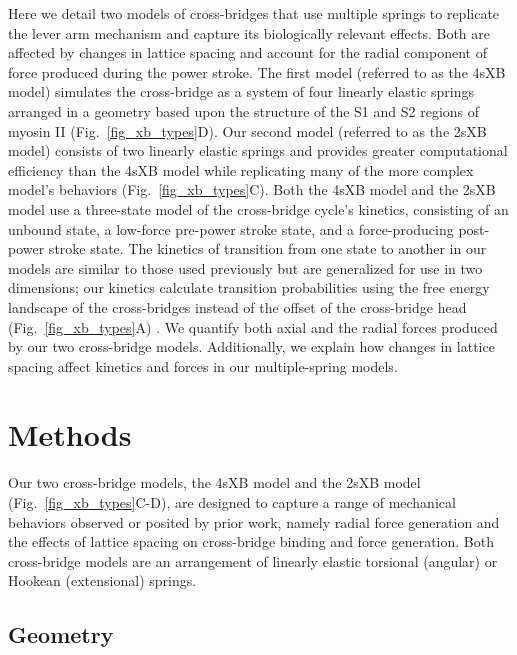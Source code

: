 \documentclass[11pt,titlepage]{article}
\begin{document}
Here we detail two models of cross-bridges that use multiple springs to replicate the lever arm mechanism and capture its biologically relevant effects.  
Both are affected by changes in lattice spacing and account for the radial component of force produced during the power stroke.  
The first model (referred to as the 4sXB model) simulates the cross-bridge as a system of four linearly elastic springs arranged in a geometry based upon the structure of the S1 and S2 regions of myosin II (Fig.~\ref{fig_xb_types}D).  
Our second model (referred to as the 2sXB model) consists of two linearly elastic springs and provides greater computational efficiency than the 4sXB model while replicating many of the more complex model's behaviors (Fig.~\ref{fig_xb_types}C). 
Both the 4sXB model and the 2sXB model use a three-state model of the cross-bridge cycle's kinetics, consisting of an unbound state, a low-force pre-power stroke state, and a force-producing post-power stroke state. 
The kinetics of transition from one state to another in our models are similar to those used previously but are generalized for use in two dimensions; our kinetics calculate transition probabilities using the free energy landscape of the cross-bridges instead of the offset of the cross-bridge head (Fig.~\ref{fig_xb_types}A) \citep{Pate1989, Daniel1998, Takagi2004, Tanner2007}. 
We quantify both axial and the radial forces produced by our two cross-bridge models. 
Additionally, we explain how changes in lattice spacing affect kinetics and forces in our multiple-spring models. 


\section*{Methods}  %

Our two cross-bridge models, the 4sXB model and the 2sXB model (Fig.~\ref{fig_xb_types}C-D), are designed to capture a range of mechanical behaviors observed or posited by prior work, namely radial force generation and the effects of lattice spacing on cross-bridge binding and force generation.  
Both cross-bridge models are an arrangement of linearly elastic torsional (angular) or Hookean (extensional) springs.  

\subsection*{Geometry} %
\end{document}
